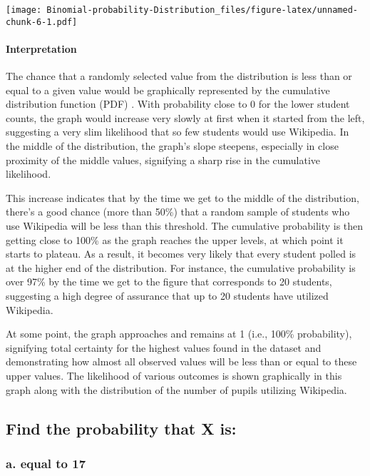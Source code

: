 \documentclass[
]{article}
\begin{document}
\texttt{[image: Binomial-probability-Distribution\_files/figure-latex/unnamed-chunk-6-1.pdf]}

\paragraph{Interpretation}\label{interpretation-3}

The chance that a randomly selected value from the distribution is less
than or equal to a given value would be graphically represented by the
cumulative distribution function (PDF) . With probability close to 0 for
the lower student counts, the graph would increase very slowly at first
when it started from the left, suggesting a very slim likelihood that so
few students would use Wikipedia. In the middle of the distribution, the
graph's slope steepens, especially in close proximity of the middle
values, signifying a sharp rise in the cumulative likelihood.

This increase indicates that by the time we get to the middle of the
distribution, there's a good chance (more than 50\%) that a random
sample of students who use Wikipedia will be less than this threshold.
The cumulative probability is then getting close to 100\% as the graph
reaches the upper levels, at which point it starts to plateau. As a
result, it becomes very likely that every student polled is at the
higher end of the distribution. For instance, the cumulative probability
is over 97\% by the time we get to the figure that corresponds to 20
students, suggesting a high degree of assurance that up to 20 students
have utilized Wikipedia.

At some point, the graph approaches and remains at 1 (i.e., 100\%
probability), signifying total certainty for the highest values found in
the dataset and demonstrating how almost all observed values will be
less than or equal to these upper values. The likelihood of various
outcomes is shown graphically in this graph along with the distribution
of the number of pupils utilizing Wikipedia.

\subsection{Find the probability that X
is:}\label{find-the-probability-that-x-is}

\subsubsection{a. equal to 17}\label{a.-equal-to-17}
\end{document}

